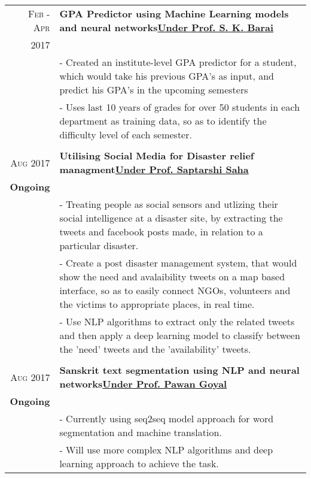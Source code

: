 \documentclass[a4paper,10pt]{extarticle} %
\begin{document}
\begin{tabular}{r|p{18cm}}

\textsc{Feb - Apr} & \textbf{GPA Predictor using Machine Learning models and neural networks}\hfill\textbf{\href{http://cse.iitkgp.ac.in/~pawang/}{Under Prof. S. K. Barai}}\\
\textsc{2017}\\
& \footnotesize{- Created an institute-level GPA predictor for a student, which would take his previous GPA's as input, and predict his GPA's in the upcoming semesters}\\
& \footnotesize{- Uses last 10 years of grades for over 50 students in each department as training data, so as to identify the difficulty level of each semester.
}\\
\multicolumn{2}{c}{} \\
\textsc{Aug 2017} & \textbf{Utilising Social Media for Disaster relief managment}\hfill\textbf{\href{http://cse.iitkgp.ac.in/~pawang/}{Under Prof. Saptarshi Saha}}\\
\textbf{Ongoing}\\
& \footnotesize{- Treating people as social sensors and utlizing their social intelligence at a disaster site, by extracting the tweets and facebook posts made, in relation to a particular disaster.}\\
& \footnotesize{- Create a post disaster management system, that would show the need and avalaibility tweets on a map based interface, so as to easily connect NGOs, volunteers and the victims to appropriate places, in real time.}\\
& \footnotesize{- Use NLP algorithms to extract only the related tweets and then apply a deep learning model to classify between the 'need' tweets and the 'availability' tweets.}\\
\multicolumn{2}{c}{} \\
\textsc{Aug 2017} & \textbf{Sanskrit text segmentation using NLP and neural networks}\hfill\textbf{\href{http://cse.iitkgp.ac.in/~pawang/}{Under Prof. Pawan Goyal}}\\
\textbf{Ongoing}\\
& \footnotesize{- Currently using seq2seq model approach for word segmentation and machine translation.}\\
& \footnotesize{- Will use more complex NLP algorithms and deep learning approach to achieve the task.}\\

\end{tabular}
\end{document}
